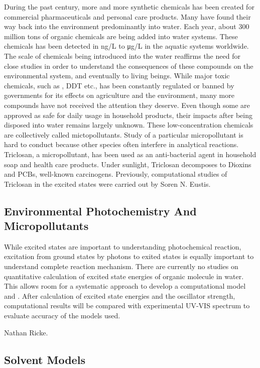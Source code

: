 \documentclass[
journal=jpcbfk, %
manuscript=article]{achemso}
\begin{document}
During the past century, more and more synthetic chemicals has been created for commercial pharmaceuticals and personal care products. Many have found their way back into the environment predominantly into water. Each year, about 300 million tons of organic chemicals are being added into water systems.\cite{Schwarzenbach2006} These chemicals has been detected in ng/L to μg/L in the aquatic systems worldwide.\cite{Monteiro2010} The scale of chemicals being introduced into the water reaffirms the need for close studies in order to understand the consequences of these compounds on the environmental system, and eventually to living beings. While major toxic chemicals, such as , DDT etc., has been constantly regulated or banned by governments for its effects on agriculture and the environment, many more compounds have not received the attention they deserve. Even though some are approved as safe for daily usage in household products, their impacts after being disposed into water  remains largely unknown. These low-concentration chemicals are collectively called mictopollutants. Study of a particular micropollutant is hard to conduct because other species often interfere in analytical reactions. Triclosan, a micropollutant, has been used as an anti-bacterial agent in household soap and health care products. Under sunlight, Triclosan decomposes to Dioxins and PCBs, well-known carcinogens.\cite{Bedoux2012} Previously, computational studies of Triclosan in the excited states were carried out by Soren N. Eustis.\cite{Kliegman2013}  

\subsection{Environmental Photochemistry And Micropollutants}

While excited states are important to understanding photochemical reaction, excitation from ground states by photons to exited states is equally important to understand complete reaction mechanism. There are currently no studies on quantitative calculation of excited state energies of organic molecule in water. This allows room for a systematic approach to develop a computational model and . After calculation of excited state energies and the oscillator strength, computational results will be compared with experimental UV-VIS spectrum to evaluate accuracy of the models used. 

Nathan Ricke.\cite{Ricke2014}

\subsection{Solvent Models}
\end{document}

